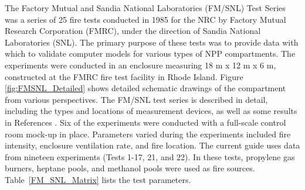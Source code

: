 The Factory Mutual and Sandia National Laboratories (FM/SNL) Test Series was a series of 25 fire tests conducted in 1985 for the NRC by Factory Mutual Research Corporation (FMRC), under the direction of Sandia National Laboratories (SNL).  The primary purpose of these tests was to provide data with which to validate computer models for various types of NPP compartments.  The experiments were conducted in an enclosure measuring 18 m x 12 m x 6 m, constructed at the FMRC fire test facility in Rhode Island.  Figure \ref{fig:FMSNL_Detailed} shows detailed schematic drawings of the compartment from various perspectives.  The FM/SNL test series is described in detail, including the types and locations of measurement devices, as well as some results in References \cite{Nowlen:1987, Sandia:1989}.  Six of
the experiments were conducted with a full-scale control room mock-up in place. Parameters varied
during the experiments included fire intensity, enclosure ventilation rate, and fire location.
The current guide uses data from nineteen experiments (Tests 1-17, 21, and 22).
In these tests,  propylene gas burners, heptane pools, and methanol pools were used as fire sources.
Table~\ref{FM_SNL_Matrix} lists the test parameters.

